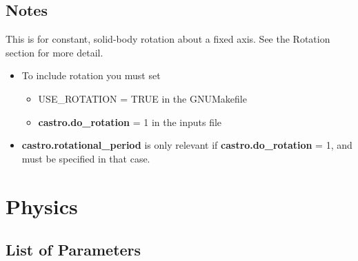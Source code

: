 \subsection{Notes}
This is for constant, solid-body rotation about a fixed axis.  See the Rotation section for more detail.
\begin{itemize}
\item To include rotation you must set
\begin{itemize}
\item USE\_ROTATION = TRUE in the GNUMakefile
\item {\bf castro.do\_rotation} = 1 in the inputs file
\end{itemize}
\item {\bf castro.rotational\_period} is only relevant if {\bf castro.do\_rotation} = 1, and must be specified in that case.
\end{itemize}

\section{Physics}

\subsection{List of Parameters}

